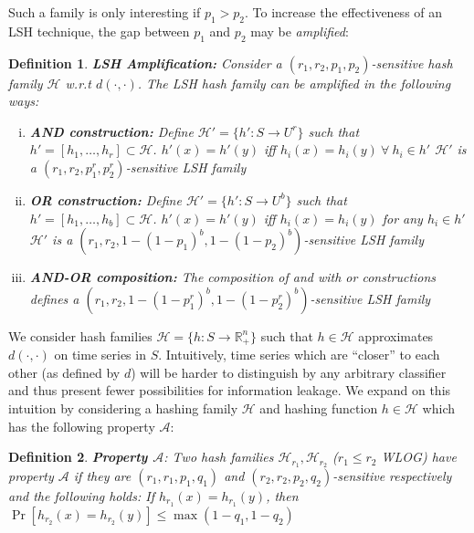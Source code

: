 \documentclass[a4paper]{article}
\newtheorem{definition}{Definition}
\begin{document}
Such a family is only interesting if $p_1 > p_2$.
To increase the effectiveness of an LSH technique, the gap between $p_1$ and $p_2$ may be \textit{amplified}:

\begin{definition}\label{defn:lsh_amplification}
    \textbf{LSH Amplification:}
    Consider a $(r_1, r_2, p_1, p_2)$-sensitive hash family $\mathcal{H}$ w.r.t $d(\cdot,\cdot)$. The LSH hash family can be amplified in the following ways:
    \begin{enumerate}[(i)]
        \item \textbf{AND construction:} Define $\mathcal{H}' = \{h' : S \rightarrow U^r\}$ such that $h' = [h_1, \ldots, h_r] \subset \mathcal{H}$.
            $h'(x) = h'(y)$ iff $h_i(x) = h_i(y) ~\forall~h_i \in h'$
            $\mathcal{H'}$ is a $(r_1, r_2, p_1^r, p_2^r)$-sensitive LSH family
        \item \textbf{OR construction:} Define $\mathcal{H}' = \{h' : S \rightarrow U^b\}$ such that $h' = [h_1, \ldots, h_b] \subset \mathcal{H}$.
            $h'(x) = h'(y)$ iff $h_i(x) = h_i(y)$ for any $h_i \in h'$
            $\mathcal{H'}$ is a $(r_1, r_2, 1-{(1-p_1)}^b, 1-{(1-p_2)}^b)$-sensitive LSH family
        \item \textbf{AND-OR composition:} The composition of \textnormal{and} with \textnormal{or} constructions defines a $(r_1, r_2, 1-{(1-p_1^r)}^b, 1-{(1-p_2^r)}^b)$-sensitive LSH family
    \end{enumerate}
\end{definition}

We consider hash families $\mathcal{H} = \{h : S \rightarrow \mathbb{R}_{+}^n\}$ such that $h \in \mathcal{H}$ approximates $d(\cdot,\cdot)$ on time series in $S$.
Intuitively, time series which are ``closer'' to each other (as defined by $d$) will be harder to distinguish by any arbitrary classifier and thus present fewer possibilities for information leakage.
We expand on this intuition by considering a hashing family $\mathcal{H}$ and hashing function $h \in \mathcal{H}$ which has the following property $\mathscr{A}$:


\begin{definition}\label{defn:property_alpha}
    \textbf{Property $\mathscr{A}$}:
    Two hash families $\mathcal{H}_{r_1}, \mathcal{H}_{r_2}$ ($r_1 \le r_2$ \textnormal{WLOG}) have property $\mathscr{A}$ if they are $(r_1, r_1, p_1, q_1)$ and $(r_2, r_2, p_2, q_2)$-sensitive respectively and the following holds:
    If $h_{r_1}(x) = h_{r_1}(y)$, then $\Pr[h_{r_2}(x) = h_{r_2}(y)] \le \max(1 - q_1, 1 - q_2)$
\end{definition}
\end{document}
